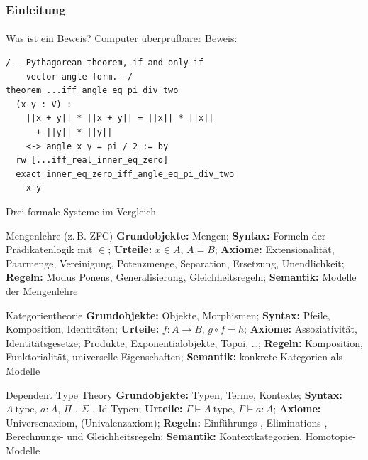 \documentclass{beamer}
\begin{document}
\begin{frame}[fragile]
    \frametitle{Einleitung}
\framesubtitle{}

\begin{block}{Was ist ein Beweis? }
\href{https://github.com/leanprover-community/mathlib4/blob/9f0aee2e9bfe008c35fa9672d28e6dd4411d2971/Mathlib/Geometry/Euclidean/Angle/Unoriented/RightAngle.lean#L44-L48}{Computer überprüfbarer Beweis}:
\begin{verbatim}
/-- Pythagorean theorem, if-and-only-if
    vector angle form. -/
theorem ...iff_angle_eq_pi_div_two
  (x y : V) :
    ||x + y|| * ||x + y|| = ||x|| * ||x||
      + ||y|| * ||y||
    <-> angle x y = pi / 2 := by
  rw [...iff_real_inner_eq_zero]
  exact inner_eq_zero_iff_angle_eq_pi_div_two
    x y
\end{verbatim}
\end{block}
 \end{frame}

\begin{frame}{Drei formale Systeme im Vergleich}
\begin{block}{Mengenlehre (z.\,B. ZFC)}
{\scriptsize
\textbf{Grundobjekte:} Mengen;
\textbf{Syntax:} Formeln der Prädikatenlogik mit $\in$;
\textbf{Urteile:} $x \in A$, $A = B$;
\textbf{Axiome:} Extensionalität, Paarmenge, Vereinigung, Potenzmenge, Separation, Ersetzung, Unendlichkeit;
\textbf{Regeln:} Modus Ponens, Generalisierung, Gleichheitsregeln;
\textbf{Semantik:} Modelle der Mengenlehre}
\end{block}
\begin{block}{Kategorientheorie}
{\scriptsize
\textbf{Grundobjekte:} Objekte, Morphismen;
\textbf{Syntax:} Pfeile, Komposition, Identitäten;
\textbf{Urteile:} $f : A \to B$, $g \circ f = h$;
\textbf{Axiome:} Assoziativität, Identitätsgesetze; Produkte, Exponentialobjekte, Topoi, \ldots;
\textbf{Regeln:} Komposition, Funktorialität, universelle Eigenschaften;
\textbf{Semantik:} konkrete Kategorien als Modelle}
\end{block}
\begin{block}{Dependent Type Theory}
{\scriptsize
\textbf{Grundobjekte:} Typen, Terme, Kontexte;
\textbf{Syntax:} $A\ \mathrm{type}$, $a : A$, $\Pi$-, $\Sigma$-, Id-Typen;
\textbf{Urteile:} $\Gamma \vdash A\ \mathrm{type}$, $\Gamma \vdash a : A$;
\textbf{Axiome:} Universenaxiom, (Univalenzaxiom);
\textbf{Regeln:} Einführungs-, Eliminations-, Berechnungs- und Gleichheitsregeln;
\textbf{Semantik:} Kontextkategorien, Homotopie-Modelle}
\end{block}
\end{frame}
\end{document}
